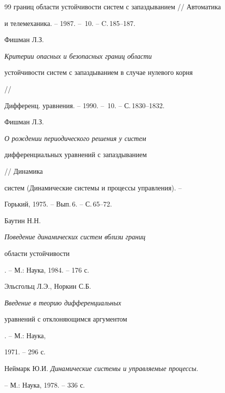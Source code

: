 \begin{thebibliography}{99}
{границ области устойчивости систем с запаздыванием} // Автоматика 


и телемеханика. -- 1987. -- \No\,10. -- C.\,185--187. 




Фишман Л.З. {\em Критерии опасных и безопасных границ области 


устойчивости систем с запаздыванием в случае нулевого корня} // 


Дифференц. уравнения. -- 1990. -- \No\,10. -- С.\,1830--1832. 




Фишман Л.З. {\em О рождении периодического решения у систем 


дифференциальных уравнений с запаздыванием} // Динамика 


систем (Динамические системы и процессы управления). --


Горький, 1975. -- Вып.\,6. -- С.\,65--72. 




Баутин Н.Н. {\em Поведение динамических систем вблизи границ 


области устойчивости}. -- М.: Наука, 1984. -- 176 с. 




Эльсгольц Л.Э., Норкин С.Б. {\em Введение в теорию дифференциальных 


уравнений с отклоняющимся аргументом}. -- М.: Наука, 


1971. -- 296 с. 




Неймарк Ю.И. {\em Динамические системы и управляемые процессы}. 


-- М.: Наука, 1978. -- 336 с. 


 


\end{thebibliography} 


 


\vskip 2cm 


 






 


\label{end} 


 


